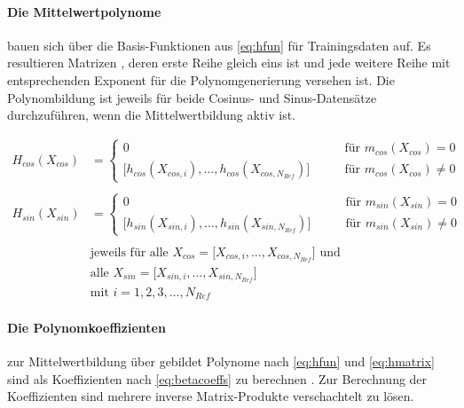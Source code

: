 \paragraph*{Die Mittelwertpolynome} bauen sich über die Basis-Funktionen aus \autoref{eq:hfun} für Trainingsdaten auf. Es resultieren Matrizen \cite{Rasmussen2006}, deren erste Reihe gleich eins ist und jede weitere Reihe mit entsprechenden Exponent für die Polynomgenerierung versehen ist. Die Polynombildung ist jeweils für beide Cosinus- und Sinus-Datensätze durchzuführen, wenn die Mittelwertbildung aktiv ist.


\begin{align}\label{eq:hmatrix}
	H_{cos}(X_{cos}) &=
		\begin{cases}
			0 															   &\qquad \text{für } m_{cos}(X_{cos}) = 0 \\
			\big[ h_{cos}(X_{cos,i}),\ldots,h_{cos}(X_{cos,N_{Ref}}) \big] &\qquad \text{für } m_{cos}(X_{cos}) \ne 0
		\end{cases} \nonumber \\
	\\
	H_{sin}(X_{sin}) &=
		\begin{cases}
			0															   &\qquad \text{für } m_{sin}(X_{sin}) = 0 \\
			\big[ h_{sin}(X_{sin,i}),\ldots,h_{sin}(X_{sin,N_{Ref}}) \big] &\qquad \text{für } m_{sin}(X_{sin}) \ne 0
		\end{cases} \nonumber \\
	\nonumber \\
	& \text{jeweils für alle } X_{cos} = \big[ X_{cos,i},\dots, X_{cos,N_{Ref}} \big] \text{ und } \nonumber \\
	& \text{alle } X_{sin} = \big[ X_{sin,i},\dots, X_{sin,N_{Ref}} \big] \nonumber \\
	& \text{mit } i = 1,2,3,\ldots,N_{Ref} \nonumber
\end{align}



\paragraph*{Die Polynomkoeffizienten} zur Mittelwertbildung über gebildet Polynome nach \autoref{eq:hfun} und \autoref{eq:hmatrix} sind als Koeffizienten nach \autoref{eq:betacoeffs} zu berechnen \cite{Rasmussen2006}. Zur Berechnung der Koeffizienten sind mehrere inverse Matrix-Produkte verschachtelt zu lösen. 


\clearpage


